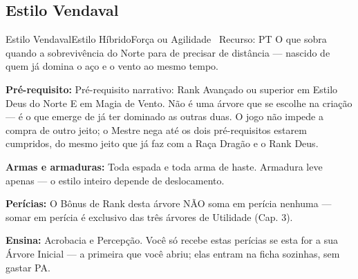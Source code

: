 
\subsection{Estilo Vendaval}
\begin{arvorecard}{Estilo Vendaval}{Estilo Híbrido}{Força ou Agilidade \textbullet\ Recurso: PT}
O que sobra quando a sobrevivência do Norte para de precisar de distância --- nascido de quem já domina o aço e o vento ao mesmo tempo.
\par\medskip\textbf{Pré-requisito:} Pré-requisito narrativo: Rank Avançado ou superior em Estilo Deus do Norte E em Magia de Vento. Não é uma árvore que se escolhe na criação --- é o que emerge de já ter dominado as outras duas. O jogo não impede a compra de outro jeito; o Mestre nega até os dois pré-requisitos estarem cumpridos, do mesmo jeito que já faz com a Raça Dragão e o Rank Deus.
\par\medskip\textbf{Armas e armaduras:} Toda espada e toda arma de haste. Armadura leve apenas --- o estilo inteiro depende de deslocamento.\par\textbf{Perícias:} O Bônus de Rank desta árvore NÃO soma em perícia nenhuma --- somar em perícia é exclusivo das três árvores de Utilidade (Cap. 3).\par{}
\par\smallskip\textbf{Ensina:} Acrobacia e Percepção. Você só recebe estas perícias se esta for a sua Árvore Inicial --- a primeira que você abriu; elas entram na ficha sozinhas, sem gastar PA.
\end{arvorecard}
